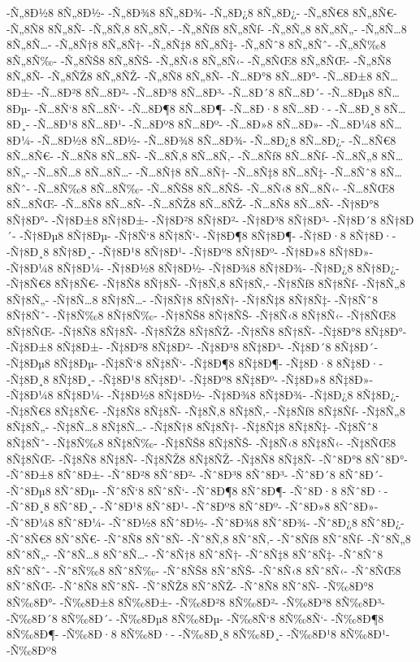 {-Ñ„8Ð½8
8Ñ„8Ð½-
-Ñ„8Ð¾8
8Ñ„8Ð¾-
-Ñ„8Ð¿8
8Ñ„8Ð¿-
-Ñ„8Ñ€8
8Ñ„8Ñ€-
-Ñ„8Ñ8
8Ñ„8Ñ-
-Ñ„8Ñ‚8
8Ñ„8Ñ‚-
-Ñ„8Ñƒ8
8Ñ„8Ñƒ-
-Ñ„8Ñ„8
8Ñ„8Ñ„-
-Ñ„8Ñ…8
8Ñ„8Ñ…-
-Ñ„8Ñ†8
8Ñ„8Ñ†-
-Ñ„8Ñ‡8
8Ñ„8Ñ‡-
-Ñ„8Ñˆ8
8Ñ„8Ñˆ-
-Ñ„8Ñ‰8
8Ñ„8Ñ‰-
-Ñ„8ÑŠ8
8Ñ„8ÑŠ-
-Ñ„8Ñ‹8
8Ñ„8Ñ‹-
-Ñ„8ÑŒ8
8Ñ„8ÑŒ-
-Ñ„8Ñ8
8Ñ„8Ñ-
-Ñ„8ÑŽ8
8Ñ„8ÑŽ-
-Ñ„8Ñ8
8Ñ„8Ñ-
-Ñ…8Ð°8
8Ñ…8Ð°-
-Ñ…8Ð±8
8Ñ…8Ð±-
-Ñ…8Ð²8
8Ñ…8Ð²-
-Ñ…8Ð³8
8Ñ…8Ð³-
-Ñ…8Ð´8
8Ñ…8Ð´-
-Ñ…8Ðµ8
8Ñ…8Ðµ-
-Ñ…8Ñ‘8
8Ñ…8Ñ‘-
-Ñ…8Ð¶8
8Ñ…8Ð¶-
-Ñ…8Ð·8
8Ñ…8Ð·-
-Ñ…8Ð¸8
8Ñ…8Ð¸-
-Ñ…8Ð¹8
8Ñ…8Ð¹-
-Ñ…8Ðº8
8Ñ…8Ðº-
-Ñ…8Ð»8
8Ñ…8Ð»-
-Ñ…8Ð¼8
8Ñ…8Ð¼-
-Ñ…8Ð½8
8Ñ…8Ð½-
-Ñ…8Ð¾8
8Ñ…8Ð¾-
-Ñ…8Ð¿8
8Ñ…8Ð¿-
-Ñ…8Ñ€8
8Ñ…8Ñ€-
-Ñ…8Ñ8
8Ñ…8Ñ-
-Ñ…8Ñ‚8
8Ñ…8Ñ‚-
-Ñ…8Ñƒ8
8Ñ…8Ñƒ-
-Ñ…8Ñ„8
8Ñ…8Ñ„-
-Ñ…8Ñ…8
8Ñ…8Ñ…-
-Ñ…8Ñ†8
8Ñ…8Ñ†-
-Ñ…8Ñ‡8
8Ñ…8Ñ‡-
-Ñ…8Ñˆ8
8Ñ…8Ñˆ-
-Ñ…8Ñ‰8
8Ñ…8Ñ‰-
-Ñ…8ÑŠ8
8Ñ…8ÑŠ-
-Ñ…8Ñ‹8
8Ñ…8Ñ‹-
-Ñ…8ÑŒ8
8Ñ…8ÑŒ-
-Ñ…8Ñ8
8Ñ…8Ñ-
-Ñ…8ÑŽ8
8Ñ…8ÑŽ-
-Ñ…8Ñ8
8Ñ…8Ñ-
-Ñ†8Ð°8
8Ñ†8Ð°-
-Ñ†8Ð±8
8Ñ†8Ð±-
-Ñ†8Ð²8
8Ñ†8Ð²-
-Ñ†8Ð³8
8Ñ†8Ð³-
-Ñ†8Ð´8
8Ñ†8Ð´-
-Ñ†8Ðµ8
8Ñ†8Ðµ-
-Ñ†8Ñ‘8
8Ñ†8Ñ‘-
-Ñ†8Ð¶8
8Ñ†8Ð¶-
-Ñ†8Ð·8
8Ñ†8Ð·-
-Ñ†8Ð¸8
8Ñ†8Ð¸-
-Ñ†8Ð¹8
8Ñ†8Ð¹-
-Ñ†8Ðº8
8Ñ†8Ðº-
-Ñ†8Ð»8
8Ñ†8Ð»-
-Ñ†8Ð¼8
8Ñ†8Ð¼-
-Ñ†8Ð½8
8Ñ†8Ð½-
-Ñ†8Ð¾8
8Ñ†8Ð¾-
-Ñ†8Ð¿8
8Ñ†8Ð¿-
-Ñ†8Ñ€8
8Ñ†8Ñ€-
-Ñ†8Ñ8
8Ñ†8Ñ-
-Ñ†8Ñ‚8
8Ñ†8Ñ‚-
-Ñ†8Ñƒ8
8Ñ†8Ñƒ-
-Ñ†8Ñ„8
8Ñ†8Ñ„-
-Ñ†8Ñ…8
8Ñ†8Ñ…-
-Ñ†8Ñ†8
8Ñ†8Ñ†-
-Ñ†8Ñ‡8
8Ñ†8Ñ‡-
-Ñ†8Ñˆ8
8Ñ†8Ñˆ-
-Ñ†8Ñ‰8
8Ñ†8Ñ‰-
-Ñ†8ÑŠ8
8Ñ†8ÑŠ-
-Ñ†8Ñ‹8
8Ñ†8Ñ‹-
-Ñ†8ÑŒ8
8Ñ†8ÑŒ-
-Ñ†8Ñ8
8Ñ†8Ñ-
-Ñ†8ÑŽ8
8Ñ†8ÑŽ-
-Ñ†8Ñ8
8Ñ†8Ñ-
-Ñ‡8Ð°8
8Ñ‡8Ð°-
-Ñ‡8Ð±8
8Ñ‡8Ð±-
-Ñ‡8Ð²8
8Ñ‡8Ð²-
-Ñ‡8Ð³8
8Ñ‡8Ð³-
-Ñ‡8Ð´8
8Ñ‡8Ð´-
-Ñ‡8Ðµ8
8Ñ‡8Ðµ-
-Ñ‡8Ñ‘8
8Ñ‡8Ñ‘-
-Ñ‡8Ð¶8
8Ñ‡8Ð¶-
-Ñ‡8Ð·8
8Ñ‡8Ð·-
-Ñ‡8Ð¸8
8Ñ‡8Ð¸-
-Ñ‡8Ð¹8
8Ñ‡8Ð¹-
-Ñ‡8Ðº8
8Ñ‡8Ðº-
-Ñ‡8Ð»8
8Ñ‡8Ð»-
-Ñ‡8Ð¼8
8Ñ‡8Ð¼-
-Ñ‡8Ð½8
8Ñ‡8Ð½-
-Ñ‡8Ð¾8
8Ñ‡8Ð¾-
-Ñ‡8Ð¿8
8Ñ‡8Ð¿-
-Ñ‡8Ñ€8
8Ñ‡8Ñ€-
-Ñ‡8Ñ8
8Ñ‡8Ñ-
-Ñ‡8Ñ‚8
8Ñ‡8Ñ‚-
-Ñ‡8Ñƒ8
8Ñ‡8Ñƒ-
-Ñ‡8Ñ„8
8Ñ‡8Ñ„-
-Ñ‡8Ñ…8
8Ñ‡8Ñ…-
-Ñ‡8Ñ†8
8Ñ‡8Ñ†-
-Ñ‡8Ñ‡8
8Ñ‡8Ñ‡-
-Ñ‡8Ñˆ8
8Ñ‡8Ñˆ-
-Ñ‡8Ñ‰8
8Ñ‡8Ñ‰-
-Ñ‡8ÑŠ8
8Ñ‡8ÑŠ-
-Ñ‡8Ñ‹8
8Ñ‡8Ñ‹-
-Ñ‡8ÑŒ8
8Ñ‡8ÑŒ-
-Ñ‡8Ñ8
8Ñ‡8Ñ-
-Ñ‡8ÑŽ8
8Ñ‡8ÑŽ-
-Ñ‡8Ñ8
8Ñ‡8Ñ-
-Ñˆ8Ð°8
8Ñˆ8Ð°-
-Ñˆ8Ð±8
8Ñˆ8Ð±-
-Ñˆ8Ð²8
8Ñˆ8Ð²-
-Ñˆ8Ð³8
8Ñˆ8Ð³-
-Ñˆ8Ð´8
8Ñˆ8Ð´-
-Ñˆ8Ðµ8
8Ñˆ8Ðµ-
-Ñˆ8Ñ‘8
8Ñˆ8Ñ‘-
-Ñˆ8Ð¶8
8Ñˆ8Ð¶-
-Ñˆ8Ð·8
8Ñˆ8Ð·-
-Ñˆ8Ð¸8
8Ñˆ8Ð¸-
-Ñˆ8Ð¹8
8Ñˆ8Ð¹-
-Ñˆ8Ðº8
8Ñˆ8Ðº-
-Ñˆ8Ð»8
8Ñˆ8Ð»-
-Ñˆ8Ð¼8
8Ñˆ8Ð¼-
-Ñˆ8Ð½8
8Ñˆ8Ð½-
-Ñˆ8Ð¾8
8Ñˆ8Ð¾-
-Ñˆ8Ð¿8
8Ñˆ8Ð¿-
-Ñˆ8Ñ€8
8Ñˆ8Ñ€-
-Ñˆ8Ñ8
8Ñˆ8Ñ-
-Ñˆ8Ñ‚8
8Ñˆ8Ñ‚-
-Ñˆ8Ñƒ8
8Ñˆ8Ñƒ-
-Ñˆ8Ñ„8
8Ñˆ8Ñ„-
-Ñˆ8Ñ…8
8Ñˆ8Ñ…-
-Ñˆ8Ñ†8
8Ñˆ8Ñ†-
-Ñˆ8Ñ‡8
8Ñˆ8Ñ‡-
-Ñˆ8Ñˆ8
8Ñˆ8Ñˆ-
-Ñˆ8Ñ‰8
8Ñˆ8Ñ‰-
-Ñˆ8ÑŠ8
8Ñˆ8ÑŠ-
-Ñˆ8Ñ‹8
8Ñˆ8Ñ‹-
-Ñˆ8ÑŒ8
8Ñˆ8ÑŒ-
-Ñˆ8Ñ8
8Ñˆ8Ñ-
-Ñˆ8ÑŽ8
8Ñˆ8ÑŽ-
-Ñˆ8Ñ8
8Ñˆ8Ñ-
-Ñ‰8Ð°8
8Ñ‰8Ð°-
-Ñ‰8Ð±8
8Ñ‰8Ð±-
-Ñ‰8Ð²8
8Ñ‰8Ð²-
-Ñ‰8Ð³8
8Ñ‰8Ð³-
-Ñ‰8Ð´8
8Ñ‰8Ð´-
-Ñ‰8Ðµ8
8Ñ‰8Ðµ-
-Ñ‰8Ñ‘8
8Ñ‰8Ñ‘-
-Ñ‰8Ð¶8
8Ñ‰8Ð¶-
-Ñ‰8Ð·8
8Ñ‰8Ð·-
-Ñ‰8Ð¸8
8Ñ‰8Ð¸-
-Ñ‰8Ð¹8
8Ñ‰8Ð¹-
-Ñ‰8Ðº8
}
